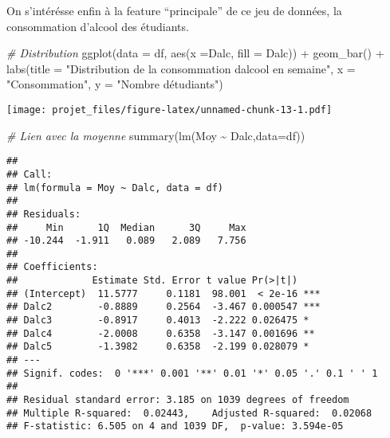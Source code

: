 \documentclass[
]{article}
\newenvironment{Shaded}{\begin{snugshade}}{\end{snugshade}}
\newcommand{\AttributeTok}[1]{\textcolor[rgb]{0.77,0.63,0.00}{#1}}
\newcommand{\CommentTok}[1]{\textcolor[rgb]{0.56,0.35,0.01}{\textit{#1}}}
\newcommand{\FunctionTok}[1]{\textcolor[rgb]{0.00,0.00,0.00}{#1}}
\newcommand{\NormalTok}[1]{#1}
\newcommand{\SpecialCharTok}[1]{\textcolor[rgb]{0.00,0.00,0.00}{#1}}
\newcommand{\StringTok}[1]{\textcolor[rgb]{0.31,0.60,0.02}{#1}}
\begin{document}
On s'intérésse enfin à la feature ``principale'' de ce jeu de données,
la consommation d'alcool des étudiants.

\begin{Shaded}
\begin{Highlighting}[]
\CommentTok{\# Distribution}
\FunctionTok{ggplot}\NormalTok{(}\AttributeTok{data =}\NormalTok{ df, }\FunctionTok{aes}\NormalTok{(}\AttributeTok{x =}\NormalTok{Dalc, }\AttributeTok{fill =}\NormalTok{ Dalc)) }\SpecialCharTok{+}
  \FunctionTok{geom\_bar}\NormalTok{() }\SpecialCharTok{+}
  \FunctionTok{labs}\NormalTok{(}\AttributeTok{title =} \StringTok{"Distribution de la consommation d\textquotesingle{}alcool en semaine"}\NormalTok{,}
       \AttributeTok{x =} \StringTok{"Consommation"}\NormalTok{, }\AttributeTok{y =} \StringTok{"Nombre d\textquotesingle{}étudiants"}\NormalTok{) }
\end{Highlighting}
\end{Shaded}

\texttt{[image: projet\_files/figure-latex/unnamed-chunk-13-1.pdf]}

\begin{Shaded}
\begin{Highlighting}[]
\CommentTok{\# Lien avec la moyenne}
\FunctionTok{summary}\NormalTok{(}\FunctionTok{lm}\NormalTok{(Moy }\SpecialCharTok{\textasciitilde{}}\NormalTok{ Dalc,}\AttributeTok{data=}\NormalTok{df))}
\end{Highlighting}
\end{Shaded}

\begin{verbatim}
## 
## Call:
## lm(formula = Moy ~ Dalc, data = df)
## 
## Residuals:
##     Min      1Q  Median      3Q     Max 
## -10.244  -1.911   0.089   2.089   7.756 
## 
## Coefficients:
##             Estimate Std. Error t value Pr(>|t|)    
## (Intercept)  11.5777     0.1181  98.001  < 2e-16 ***
## Dalc2        -0.8889     0.2564  -3.467 0.000547 ***
## Dalc3        -0.8917     0.4013  -2.222 0.026475 *  
## Dalc4        -2.0008     0.6358  -3.147 0.001696 ** 
## Dalc5        -1.3982     0.6358  -2.199 0.028079 *  
## ---
## Signif. codes:  0 '***' 0.001 '**' 0.01 '*' 0.05 '.' 0.1 ' ' 1
## 
## Residual standard error: 3.185 on 1039 degrees of freedom
## Multiple R-squared:  0.02443,    Adjusted R-squared:  0.02068 
## F-statistic: 6.505 on 4 and 1039 DF,  p-value: 3.594e-05
\end{verbatim}

\begin{Shaded}
\end{Shaded}
\end{document}
